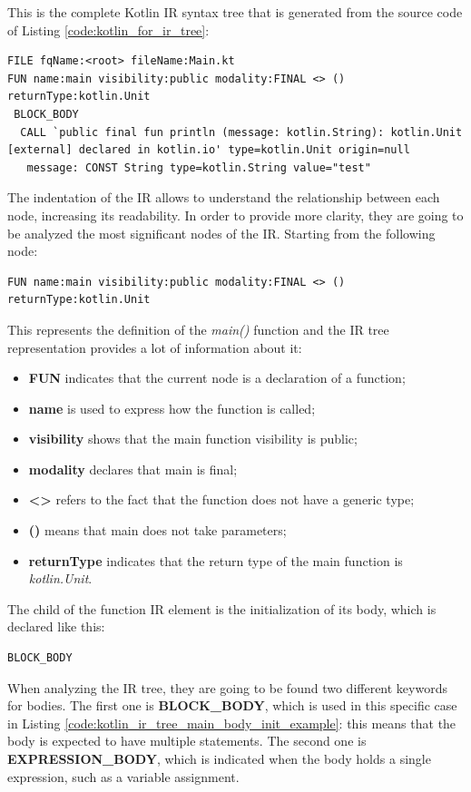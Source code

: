 This is the complete Kotlin IR syntax tree that is generated from the source code of Listing \ref{code:kotlin_for_ir_tree}:
\begin{lstlisting}[caption={Kotlin IR tree of Listing \ref{code:kotlin_for_ir_tree}}, captionpos=b, basicstyle=\small, label={code:kotlin_ir_tree_example}]
FILE fqName:<root> fileName:Main.kt
FUN name:main visibility:public modality:FINAL <> () returnType:kotlin.Unit
 BLOCK_BODY
  CALL `public final fun println (message: kotlin.String): kotlin.Unit [external] declared in kotlin.io' type=kotlin.Unit origin=null
   message: CONST String type=kotlin.String value="test"
\end{lstlisting}
The indentation of the IR allows to understand the relationship between each node, increasing its readability. In order to provide more clarity, they are going to be analyzed the most significant nodes of the IR.\newline
Starting from the following node:
\begin{lstlisting}[caption={Kotlin IR tree of the main function in Listing \ref{code:kotlin_for_ir_tree}}, captionpos=b, label={code:kotlin_ir_tree_main_example}]
FUN name:main visibility:public modality:FINAL <> () returnType:kotlin.Unit
\end{lstlisting}
This represents the definition of the \textit{main()} function and the IR tree representation provides a lot of information about it:
\begin{itemize}
    \item \textbf{FUN} indicates that the current node is a declaration of a function;
    \item \textbf{name} is used to express how the function is called;
    \item \textbf{visibility} shows that the main function visibility is public;
    \item \textbf{modality} declares that main is final;
    \item \textbf{<>} refers to the fact that the function does not have a generic type;
    \item \textbf{()} means that main does not take parameters;
    \item \textbf{returnType} indicates that the return type of the main function is \textit{kotlin.Unit}.
\end{itemize}

The child of the function IR element is the initialization of its body, which is declared like this:
\begin{lstlisting}[caption={Kotlin IR tree of the body block of the main function in Listing \ref{code:kotlin_for_ir_tree}}, captionpos=b, label={code:kotlin_ir_tree_main_body_init_example}]
BLOCK_BODY
\end{lstlisting}
When analyzing the IR tree, they are going to be found two different keywords for bodies. The first one is \textbf{BLOCK\_BODY}, which is used in this specific case in Listing \ref{code:kotlin_ir_tree_main_body_init_example}: this means that the body is expected to have multiple statements. The second one is \textbf{EXPRESSION\_BODY}, which is indicated when the body holds a single expression, such as a variable assignment.

